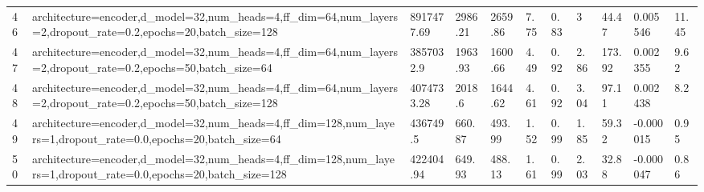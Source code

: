 \begin{longtable}{C{0.8cm} L{2cm} C{1.15cm} C{1.15cm} C{1.15cm} C{1.15cm} C{0.85cm} C{1.25cm} C{1.2cm} C{1.5cm} C{1.0cm}}
46 & architecture=encoder,\newline d\_model=32,\newline num\_heads=4,\newline ff\_dim=64,\newline num\_layers=2,\newline dropout\_rate=0.2,\newline epochs=20,\newline batch\_size=128 & 8917477.69 & 2986.21 & 2659.86 & 7.75 & 0.83 & 3 & 44.47 & 0.005546 & 11.45 \\
47 & architecture=encoder,\newline d\_model=32,\newline num\_heads=4,\newline ff\_dim=64,\newline num\_layers=2,\newline dropout\_rate=0.2,\newline epochs=50,\newline batch\_size=64 & 3857032.9 & 1963.93 & 1600.66 & 4.49 & 0.92 & 2.86 & 173.92 & 0.002355 & 9.62 \\
48 & architecture=encoder,\newline d\_model=32,\newline num\_heads=4,\newline ff\_dim=64,\newline num\_layers=2,\newline dropout\_rate=0.2,\newline epochs=50,\newline batch\_size=128 & 4074733.28 & 2018.6 & 1644.62 & 4.61 & 0.92 & 3.04 & 97.11 & 0.002438 & 8.2 \\
49 & architecture=encoder,\newline d\_model=32,\newline num\_heads=4,\newline ff\_dim=128,\newline num\_layers=1,\newline dropout\_rate=0.0,\newline epochs=20,\newline batch\_size=64 & 436749.5 & 660.87 & 493.99 & 1.52 & 0.99 & 1.85 & 59.32 & -0.000015 & 0.95 \\
50 & architecture=encoder,\newline d\_model=32,\newline num\_heads=4,\newline ff\_dim=128,\newline num\_layers=1,\newline dropout\_rate=0.0,\newline epochs=20,\newline batch\_size=128 & 422404.94 & 649.93 & 488.13 & 1.61 & 0.99 & 2.03 & 32.88 & -0.000047 & 0.86 \\

\end{longtable}
